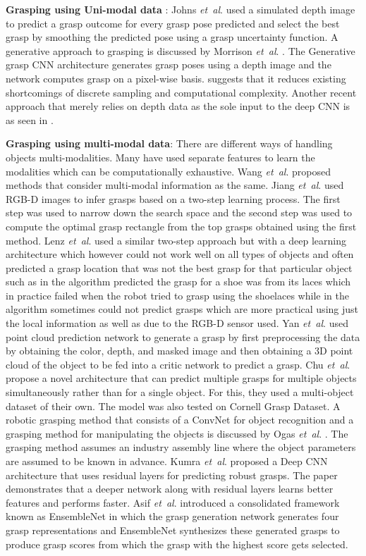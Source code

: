 \documentclass[letterpaper, 10pt, conference]{IEEEtran}
\newcommand{\etal}{\textit{et~al}. }
\begin{document}
\textbf{Grasping using Uni-modal data} : Johns \etal \cite{johns2016deep} used a simulated depth image to predict a grasp outcome for every grasp pose predicted and select the best grasp by smoothing the predicted pose using a grasp uncertainty function. A generative approach to grasping is discussed by Morrison \etal \cite{morrison2019learning}. The Generative grasp CNN architecture generates grasp poses using a depth image and the network computes grasp on a pixel-wise basis. \cite{morrison2019learning} suggests that it reduces existing shortcomings of discrete sampling and computational complexity. Another recent approach that merely relies on depth data as the sole input to the deep CNN is as seen in \cite{schmidt2018grasping}.

\textbf{Grasping using multi-modal data}: There are different ways of handling objects multi-modalities. Many have used separate features to learn the modalities which can be computationally exhaustive. Wang \etal \cite{wang2016robot} proposed methods that consider multi-modal information as the same. Jiang \etal \cite{jiang2011efficient} used RGB-D images to infer grasps based on a two-step learning process. The first step was used to narrow down the search space and the second step was used to compute the optimal grasp rectangle from the top grasps obtained using the first method. Lenz \etal \cite{lenz2015deep} used a similar two-step approach but with a deep learning architecture which however could not work well on all types of objects and often predicted a grasp location that was not the best grasp for that particular object such as in \cite{jiang2011efficient} the algorithm predicted the grasp for a shoe was from its laces which in practice failed when the robot tried to grasp using the shoelaces while in \cite{lenz2015deep} the algorithm sometimes could not predict grasps which are more practical using just the local information as well as due to the RGB-D sensor used. Yan \etal \cite{yan2019data} used point cloud prediction network to generate a grasp by first preprocessing the data by obtaining the color, depth, and masked image and then obtaining a 3D point cloud of the object to be fed into a critic network to predict a grasp. Chu \etal \cite{chu2018real} propose a novel architecture that can predict multiple grasps for multiple objects simultaneously rather than for a single object. For this, they used a multi-object dataset of their own. The model was also tested on Cornell Grasp Dataset. A robotic grasping method that consists of a ConvNet for object recognition and a grasping method for manipulating the objects is discussed by Ogas \etal \cite{ogas2019robotic}. The grasping method assumes an industry assembly line where the object parameters are assumed to be known in advance. Kumra \etal \cite{kumra2017robotic} proposed a Deep CNN architecture that uses residual layers for predicting robust grasps. The paper demonstrates that a deeper network along with residual layers learns better features and performs faster. Asif \etal \cite{Asif2018EnsembleNetIG} introduced a consolidated framework known as EnsembleNet in which the grasp generation network generates four grasp representations and EnsembleNet synthesizes these generated grasps to produce grasp scores from which the grasp with the highest score gets selected.
\end{document}

